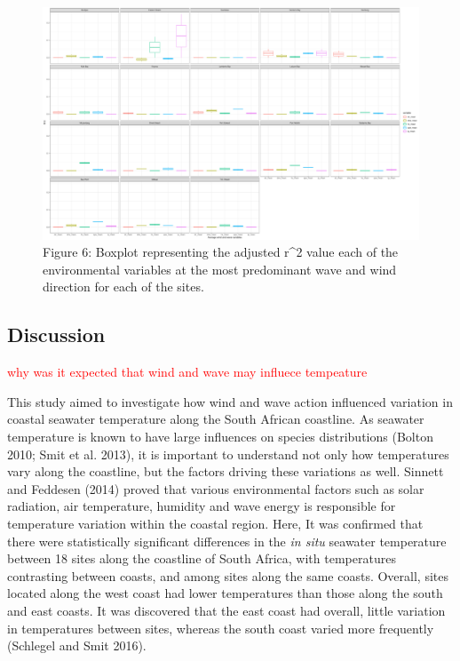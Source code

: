 \documentclass[12pt,A4paper,]{article}
\begin{document}
\begin{figure}
\centering
\includegraphics{../figures/predominant_ww.pdf}
\caption{Figure 6: Boxplot representing the adjusted r\^{}2 value each
of the environmental variables at the most predominant wave and wind
direction for each of the sites.}
\end{figure}

\subsection{Discussion}\label{discussion}

\textcolor{red}{why was it expected that wind and wave may influece tempeature}

This study aimed to investigate how wind and wave action influenced
variation in coastal seawater temperature along the South African
coastline. As seawater temperature is known to have large influences on
species distributions (Bolton 2010; Smit et al. 2013), it is important
to understand not only how temperatures vary along the coastline, but
the factors driving these variations as well. Sinnett and Feddesen
(2014) proved that various environmental factors such as solar
radiation, air temperature, humidity and wave energy is responsible for
temperature variation within the coastal region. Here, It was confirmed
that there were statistically significant differences in the \emph{in
situ} seawater temperature between 18 sites along the coastline of South
Africa, with temperatures contrasting between coasts, and among sites
along the same coasts. Overall, sites located along the west coast had
lower temperatures than those along the south and east coasts. It was
discovered that the east coast had overall, little variation in
temperatures between sites, whereas the south coast varied more
frequently (Schlegel and Smit 2016).
\end{document}
